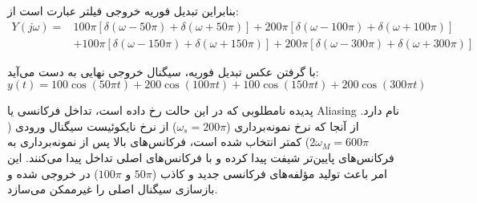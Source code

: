 بنابراین تبدیل فوریه خروجی فیلتر عبارت است از:
\begin{align*}
Y(j\omega) = & 100\pi [\delta(\omega-50\pi)+\delta(\omega+50\pi)] + 200\pi [\delta(\omega-100\pi)+\delta(\omega+100\pi)] \\
& + 100\pi [\delta(\omega-150\pi)+\delta(\omega+150\pi)] + 200\pi [\delta(\omega-300\pi)+\delta(\omega+300\pi)]
\end{align*}

با گرفتن عکس تبدیل فوریه، سیگنال خروجی نهایی به دست می‌آید:
\begin{equation*}
y(t) = 100\cos(50\pi t) + 200\cos(100\pi t) + 100\cos(150\pi t) + 200\cos(300\pi t)
\end{equation*}

پدیده نامطلوبی که در این حالت رخ داده است، {تداخل فرکانسی یا Aliasing} نام دارد. از آنجا که نرخ نمونه‌برداری ($\omega_s = 200\pi$) از نرخ نایکوئیست سیگنال ورودی ($2\omega_M = 600\pi$) کمتر انتخاب شده است، فرکانس‌های بالا پس از نمونه‌برداری به فرکانس‌های پایین‌تر شیفت پیدا کرده و با فرکانس‌های اصلی تداخل پیدا می‌کنند. این امر باعث تولید مؤلفه‌های فرکانسی جدید و کاذب ($50\pi$ و $100\pi$) در خروجی شده و بازسازی سیگنال اصلی را غیرممکن می‌سازد.
